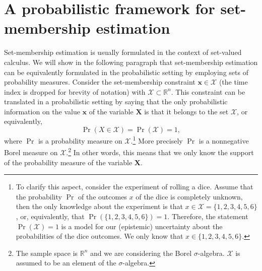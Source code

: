\documentclass[twocolumn]{autart}
\newcommand{\DP}[1]{{#1}}
\begin{document}


\section{A probabilistic framework for set-membership estimation}
 Set-membership estimation is usually formulated in the context of set-valued calculus.
We will show in the following paragraph that  set-membership estimation can  be equivalently formulated in the probabilistic setting by employing sets
of probability measures. %
Consider the set-membership constraint $\mathbf{x}\in \mathcal{X}$ (the time index is dropped for brevity of notation)
with $\mathcal{X}\subset \mathbb{R}^n$. This constraint can be translated in a probabilistic setting
by saying that the only probabilistic information on the value $\mathbf{x}$ of the variable $\mathbf{X}$ is
that it belongs to the set $\mathcal{X}$, or equivalently,
$$
\Pr(X \in \mathcal{X})=\Pr(\mathcal{X})=1,
$$
where $\Pr$ is a probability measure on $\mathcal{X}$.\footnote{To clarify this aspect, consider the experiment of rolling a  dice. Assume that the probability  $\Pr$ of the outcomes $x$ of the dice is completely unknown, then the only knowledge about the experiment
is that $x \in \mathcal{X}=\{1,2,3,4,5,6\}$, or, equivalently, that $\Pr(\{1,2,3,4,5,6\})=1$. Therefore, the statement $\Pr(\mathcal{X})=1$
is a model for our (epistemic) uncertainty about the probabilities of the dice outcomes. We only know that $x \in \{1,2,3,4,5,6\}$.}
More precisely $\Pr$ is a nonnegative Borel measure on $\mathcal{X}$.\footnote{The sample space is $\mathbb{R}^n$ and we are considering the Borel
$\sigma$-algebra. $\mathcal{X}$ is assumed to be an element of the $\sigma$-algebra.}
In other words, this means that we only know the support of the probability measure of the variable $\mathbf{X}$.
\end{document}
